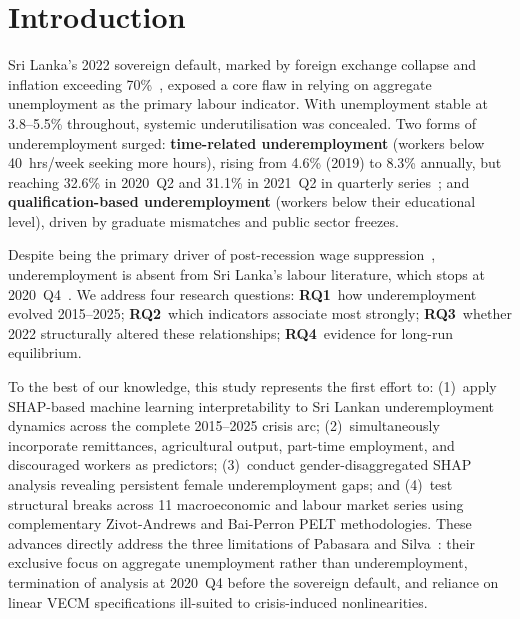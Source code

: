 \documentclass[sigconf]{acmart}
\begin{document}
\maketitle

\section{Introduction}

Sri Lanka's 2022 sovereign default, marked by foreign exchange
collapse and inflation exceeding 70\%~\cite{cbsl2025}, exposed a core flaw in
relying on aggregate unemployment as the primary labour indicator. With
unemployment stable at 3.8--5.5\% throughout, systemic underutilisation
was concealed. Two forms of underemployment surged: \textbf{time-related
underemployment} (workers below 40~hrs/week seeking more hours), rising
from 4.6\% (2019) to 8.3\% annually, but reaching 32.6\% in 2020~Q2 and
31.1\% in 2021~Q2 in quarterly series~\cite{dcs2025}; and
\textbf{qualification-based underemployment} (workers below their
educational level), driven by graduate mismatches and public sector
freezes.

Despite being the primary driver of post-recession wage
suppression~\cite{bell2018underemployment}, underemployment is absent from
Sri Lanka's labour literature, which stops at 2020~Q4~\cite{pabasara2025impact}.
We address four research questions: \textbf{RQ1}~how underemployment evolved
2015--2025; \textbf{RQ2}~which indicators associate most strongly;
\textbf{RQ3}~whether 2022 structurally altered these relationships;
\textbf{RQ4}~evidence for long-run equilibrium.

To the best of our knowledge, this study represents the first
effort to: (1)~apply SHAP-based machine learning interpretability
to Sri Lankan underemployment dynamics across the complete
2015--2025 crisis arc; (2)~simultaneously incorporate remittances,
agricultural output, part-time employment, and discouraged workers
as predictors; (3)~conduct gender-disaggregated SHAP analysis
revealing persistent female underemployment gaps; and (4)~test
structural breaks across 11 macroeconomic and labour market series
using complementary Zivot-Andrews and Bai-Perron PELT
methodologies. These advances directly address the three limitations
of Pabasara and Silva~\cite{pabasara2025impact}: their exclusive focus on aggregate
unemployment rather than underemployment, termination of analysis
at 2020~Q4 before the sovereign default, and reliance on linear
VECM specifications ill-suited to crisis-induced nonlinearities.
\end{document}

